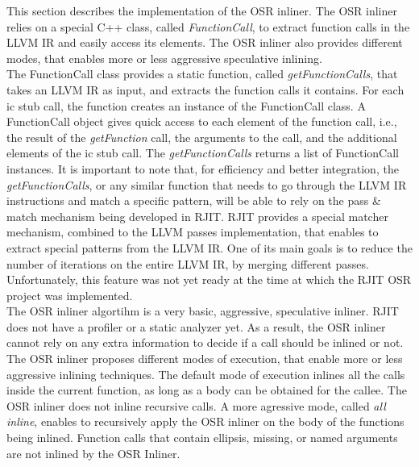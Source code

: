 This section describes the implementation of the OSR inliner.
The OSR inliner relies on a special C++ class, called \textit{FunctionCall}, to extract function calls in the LLVM IR and easily access its elements. 
The OSR inliner also provides different modes, that enables more or less aggressive speculative inlining.\\

The FunctionCall class provides a static function, called \textit{getFunctionCalls}, that takes an LLVM IR as input, and extracts the function calls it contains.
For each ic stub call, the function creates an instance of the FunctionCall class. 
A FunctionCall object gives quick access to each element of the function call, i.e., the result of the \textit{getFunction} call, the arguments to the call, and the additional elements of the ic stub call.
The \textit{getFunctionCalls} returns a list of FunctionCall instances.
It is important to note that, for efficiency and better integration, the \textit{getFunctionCalls}, or any similar function that needs to go through the LLVM IR instructions and match a specific pattern, will be able to rely on the pass \& match mechanism being developed in RJIT.
RJIT provides a special matcher mechanism, combined to the LLVM passes implementation, that enables to extract special patterns from the LLVM IR.
One of its main goals is to reduce the number of iterations on the entire LLVM IR, by merging different passes.
Unfortunately, this feature was not yet ready at the time at which the RJIT OSR project was implemented.\\

The OSR inliner algortihm is a very basic, aggressive, speculative inliner. 
RJIT does not have a profiler or a static analyzer yet.
As a result, the OSR inliner cannot rely on any extra information to decide if a call should be inlined or not.
The OSR inliner proposes different modes of execution, that enable more or less aggressive inlining techniques.
The default mode of execution inlines all the calls inside the current function, as long as a body can be obtained for the callee.
The OSR inliner does not inline recursive calls.
A more agressive mode, called \textit{all inline}, enables to recursively apply the OSR inliner on the body of the functions being inlined.
Function calls that contain ellipsis, missing, or named arguments are not inlined by the OSR Inliner.
\\


